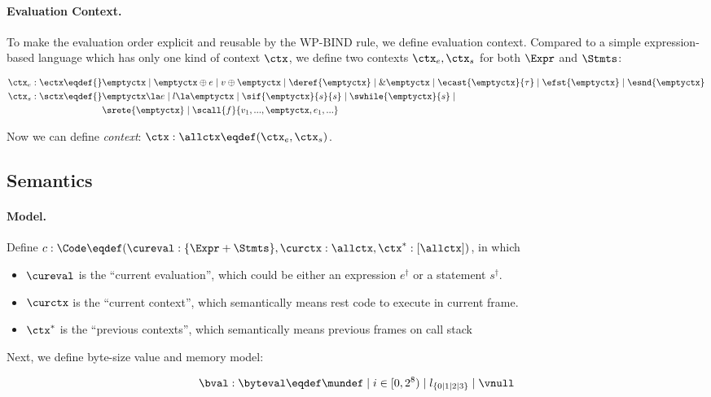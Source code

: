 \paragraph{Evaluation Context.}

To make the evaluation order explicit and reusable by the $\text{WP-BIND}$ rule, we define evaluation context.
Compared to a simple expression-based language which has only one kind of context $\ctx$, we define two contexts
$\ctx_e, \ctx_s$ for both $\Expr$ and $\Stmts$:

\begin{align*}
    \ctx_e : \ectx \eqdef{}&
        \emptyctx \mid \emptyctx \oplus e \mid v \oplus \emptyctx \mid
        \deref{\emptyctx} \mid \& \emptyctx \mid \ecast{\emptyctx}{\tau} \mid
        \efst{\emptyctx} \mid \esnd{\emptyctx}
\\
    \ctx_s : \sctx \eqdef{}&
        \emptyctx \la e \mid l \la \emptyctx \mid \sif{\emptyctx}{s}{s} \mid \swhile{\emptyctx}{s} \mid \\&
         \srete{\emptyctx} \mid \scall{f}{v_1, ..., \emptyctx, e_1, ...}
\end{align*}

Now we can define \emph{context}: $\ctx : \allctx \eqdef (\ctx_e, \ctx_s)$.

\subsection{Semantics}
\paragraph{Model.}

Define $c: \Code \eqdef (\cureval: \{ \Expr + \Stmts\}, \curctx: \allctx, \ctx^{*}: [\allctx])$, in which

\begin{itemize}
\item $\cureval$ is the ``current evaluation'', which could be either an expression $e^\dag$ or a statement $s^\dag$.
\item $\curctx$ is the ``current context'', which semantically means rest code to execute in current frame.
\item $\ctx^{*}$ is the ``previous contexts'', which semantically means previous frames on call stack
\end{itemize}

Next, we define byte-size value and memory model:

\[\bval : \byteval \eqdef \mundef \mid i \in [0, 2^8) \mid l_{\{0 \mid 1 \mid 2 \mid 3\}} \mid \vnull\]

